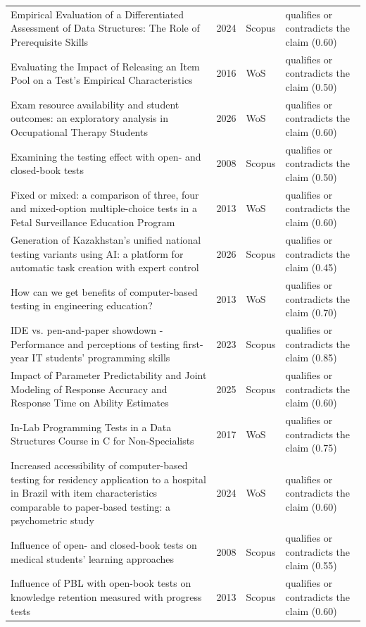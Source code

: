 \begin{longtable}{@{}%
  >{\raggedright\arraybackslash}p{}c%
  >{\raggedright\arraybackslash}p{}%
  >{\raggedright\arraybackslash}p{}@{}}
Empirical Evaluation of a Differentiated Assessment of Data Structures: The Role of Prerequisite Skills & 2024 & Scopus & qualifies or contradicts the claim (0.60) \\
Evaluating the Impact of Releasing an Item Pool on a Test's Empirical Characteristics & 2016 & WoS & qualifies or contradicts the claim (0.50) \\
Exam resource availability and student outcomes: an exploratory analysis in Occupational Therapy Students & 2026 & WoS & qualifies or contradicts the claim (0.60) \\
Examining the testing effect with open- and closed-book tests & 2008 & Scopus & qualifies or contradicts the claim (0.50) \\
Fixed or mixed: a comparison of three, four and mixed-option multiple-choice tests in a Fetal Surveillance Education Program & 2013 & WoS & qualifies or contradicts the claim (0.60) \\
Generation of Kazakhstan's unified national testing variants using AI: a platform for automatic task creation with expert control & 2026 & Scopus & qualifies or contradicts the claim (0.45) \\
How can we get benefits of computer-based testing in engineering education? & 2013 & WoS & qualifies or contradicts the claim (0.70) \\
IDE vs. pen-and-paper showdown - Performance and perceptions of testing first-year IT students' programming skills & 2023 & Scopus & qualifies or contradicts the claim (0.85) \\
Impact of Parameter Predictability and Joint Modeling of Response Accuracy and Response Time on Ability Estimates & 2025 & Scopus & qualifies or contradicts the claim (0.60) \\
In-Lab Programming Tests in a Data Structures Course in C for Non-Specialists & 2017 & WoS & qualifies or contradicts the claim (0.75) \\
Increased accessibility of computer-based testing for residency application to a hospital in Brazil with item characteristics comparable to paper-based testing: a psychometric study & 2024 & WoS & qualifies or contradicts the claim (0.60) \\
Influence of open- and closed-book tests on medical students' learning approaches & 2008 & Scopus & qualifies or contradicts the claim (0.55) \\
Influence of PBL with open-book tests on knowledge retention measured with progress tests & 2013 & Scopus & qualifies or contradicts the claim (0.60) \\

\end{longtable}
